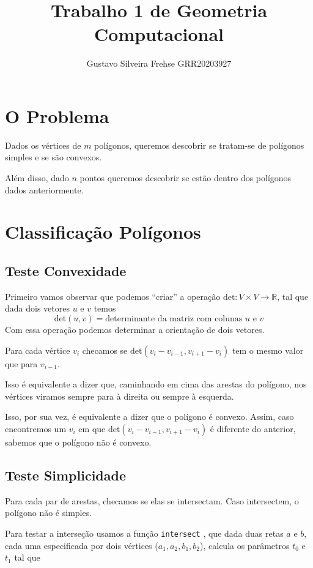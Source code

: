 \documentclass[12pt]{article}
\title{Trabalho 1 de Geometria Computacional}
\author{Gustavo Silveira Frehse GRR20203927}
\begin{document}
  \maketitle
  \section{O Problema}
  Dados os vértices de $m$ polígonos, queremos descobrir se tratam-se de
  polígonos simples e se são convexos.

  Além disso, dado $n$ pontos queremos descobrir se estão dentro dos polígonos
  dados anteriormente.

  \section{Classificação Polígonos}
  \subsection{Teste Convexidade} Primeiro vamos observar que podemos ``criar'' a
  operação $\text{det} : V \times V \rightarrow \mathbb{R}$, tal que dada dois
  vetores $u$ e $v$ temos 
  \[
    \text{det}(u, v) = \text{determinante da matriz com colunas } u \text{ e } v
  \]
  Com essa operação podemos determinar a orientação de dois vetores.

  Para cada vértice $v_i$ checamos se $\text{det}(v_i - v_{i-1}, v_{i+1} - v_i)$
  tem o mesmo valor que para $v_{i - 1}$.

  Isso é equivalente a dizer que, caminhando em cima das arestas do polígono,
  nos vértices viramos sempre para à direita ou sempre à esquerda.

  Isso, por sua vez, é equivalente a dizer que o polígono é convexo. Assim, caso
  encontremos um $v_i$ em que $\text{det}(v_i - v_{i-1}, v_{i+1} - v_i)$ é
  diferente do anterior, sabemos que o polígono não é convexo.

  \subsection{Teste Simplicidade}
  Para cada par de arestas, checamos se elas se intersectam. Caso intersectem, o
  polígono não é simples.

  Para testar a interseção usamos a função \verb|intersect|
  \cite{wik-intersect}, que dada duas retas $a$ e $b$, cada uma especificada por
  dois vértices ($a_1, a_2, b_1, b_2$), calcula os parâmetros $t_0$ e $t_1$ tal
  que 
\end{document}
